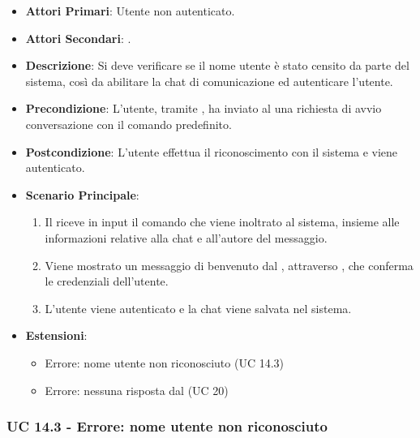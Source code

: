 	\begin{itemize}
		\item \textbf{Attori Primari}: Utente non autenticato.
		\item \textbf{Attori Secondari}: .
		\item \textbf{Descrizione}: Si deve verificare se il nome utente è stato censito da parte del sistema, così da abilitare la chat di comunicazione ed autenticare l'utente.
		\item \textbf{Precondizione}: L'utente, tramite , ha inviato al  una richiesta di avvio conversazione con il comando predefinito.
		\item \textbf{Postcondizione}: L'utente effettua il riconoscimento con il sistema e viene autenticato.
		\item \textbf{Scenario Principale}:
		\begin{enumerate}
			\item Il   riceve in input il comando che viene inoltrato al sistema, insieme alle informazioni relative alla chat e all'autore del messaggio.
			\item Viene mostrato un messaggio di benvenuto dal , attraverso , che conferma le credenziali dell'utente.
			\item L'utente viene autenticato e la chat viene salvata nel sistema.
		\end{enumerate}
		\item \textbf{Estensioni}:
		\begin{itemize}
			\item Errore: nome utente  non riconosciuto (UC 14.3)
			\item Errore: nessuna risposta dal   (UC 20)
		\end{itemize}
	\end{itemize}

	\subsubsection{UC 14.3 - Errore: nome utente  non riconosciuto}

